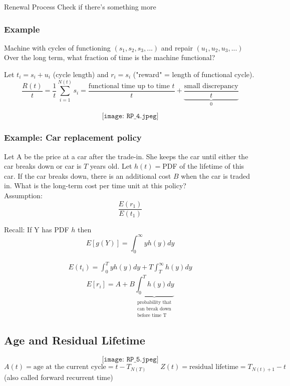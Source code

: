 \documentclass[12pt]{article}
\begin{document}
\begin{section}{Renewal Process}
Check if there's something more

\subsubsection{Example} 
Machine with cycles of functioning $(s_1,s_2,s_3,...)$ and repair $(u_1,u_2,u_3,...)$ Over the long term, what fraction of time is the machine functional?

\vspace{2\baselineskip}
Let $t_i = s_i + u_i$ (cycle length) and $r_i = s_i$ ("reward" = length of functional cycle).
$$\frac{R(t)}{t} = \frac{1}{t} \sum\limits_{i=1}^{N(t)} s_i
=\frac{\text{functional time up to time $t$}}{t}+\underbrace{\frac{\text{small discrepancy}}{t}}_0$$

$$\texttt{[image: RP\_4.jpeg]}$$


\vspace{1\baselineskip}
\subsubsection{Example: Car replacement policy}
Let A be the price at a car after the trade-in. She keeps the car until either the car breaks down or car is $T$ years old. Let $h(t)=$PDF of the lifetime of this car. If the car breaks down, there is an additional cost $B$ when the car is traded in. What is the long-term cost per time unit at this policy?\\

Assumption: $$\frac{E(r_1)}{E(t_1)}$$

Recall: If Y has PDF $h$ then 
$$E[g(Y)]=\int_0^\infty yh(y)dy$$

\begin{align}
    E(t_i) = \int_0^T yh(y)dy + T\int_T^\infty h(y)dy \tag{since T is maximum time for a period} \nonumber
\end{align}
$$E[r_i] = A+B\underbrace{\int_0^T h(y)dy}_{
\substack{
\text{probability that}\\ \text{can break down} \\ \text{before time T}}}$$

\newpage
\subsection{Age and Residual Lifetime} 
$$\texttt{[image: RP\_5.jpeg]}$$
$$A(t) = \text{age at the current cycle} = t - T_{N(T)}\qquad
Z(t) = \text{residual lifetime} = T_{N(t)+1} - t$$
\hfill (also called forward recurrent time)


\end{section}
\end{document}
